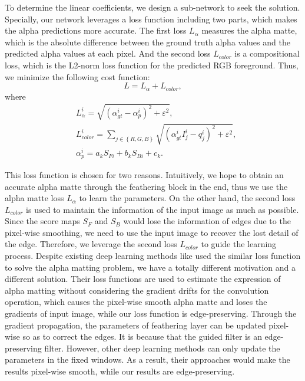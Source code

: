 \documentclass[sigconf]{acmart}
\begin{document}
To determine the linear coefficients, we design a sub-network to seek the solution. Specially, our network leverages a loss function including two parts, which makes the alpha predictions more accurate. The first loss ${L_\alpha }$ measures the alpha matte, which is the absolute difference between the ground truth alpha values and the predicted alpha values at each pixel. And the second loss $L_{color}$ is a compositional loss, which is the L2-norm loss function for the predicted RGB foreground. Thus, we minimize the following cost function:
\begin{equation}
L = {L_\alpha } + {L_{color}},
\end{equation}
where
\begin{displaymath}
\begin{aligned}
&L_\alpha ^i = \sqrt {{{\left( {\alpha _{gt}^i - \alpha _p^i} \right)}^2} + {\varepsilon ^2}}, \\
&L_{color}^i = \sum\limits_{j \in \left\{ {R,G,B} \right\}} {\sqrt {{{\left( {\alpha _{gt}^iI_j^i - q_j^i} \right)}^2} + {\varepsilon ^2}} } , \\
&\alpha _p^i = {a_k}{S_{Fi}} + {b_k}{S_{Bi}} + {c_k}.
 \end{aligned}
\end{displaymath}

This loss function is chosen for two reasons. Intuitively, we hope to obtain an accurate alpha matte through the feathering block in the end, thus we use the alpha matte loss ${L_\alpha }$ to learn the parameters. On the other hand, the second loss ${L_{color}}$ is used to maintain the information of the input image as much as possible. Since the score maps ${S_F}$ and ${S_B}$ would lose the information of edges due to the pixel-wise smoothing, we need to use the input image to recover the lost detail of the edge. Therefore, we leverage the second loss ${L_{color}}$ to guide the learning process. Despite existing deep learning methods like \cite{Cho2016Natural,shen2016deep,xu2017deep} used the similar loss function to solve the alpha matting problem, we have a totally different motivation and a different solution. Their loss functions are used to estimate the expression of alpha matting without considering the gradient drifts for the convolution operation, which causes the pixel-wise smooth alpha matte and loses the gradients of input image, while our loss function is edge-preserving. Through the gradient propagation, the parameters of feathering layer can be updated pixel-wise so as to correct the edges. It is because that the guided filter is an edge-preserving filter. However, other deep learning methods can only update the parameters in the fixed windows. As a result, their approaches would make the results pixel-wise smooth, while our results are edge-preserving.
\end{document}
